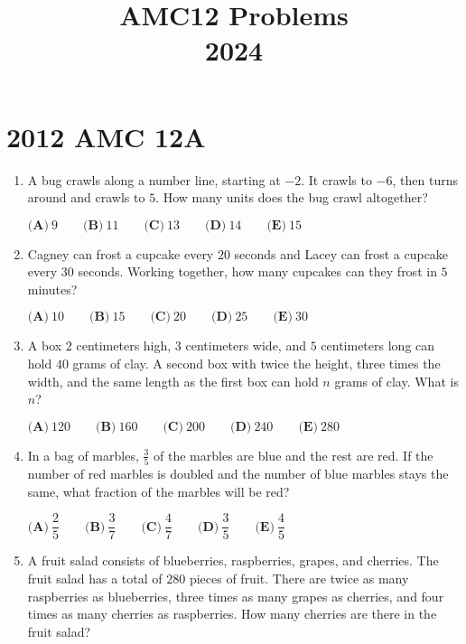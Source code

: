 \documentclass{article}
\title{AMC12 Problems \\ 2024}
\date{}
\begin{document}
\maketitle\thispagestyle{fancy}\newpage\section*{2012 AMC 12A}\begin{enumerate}[label=\arabic*., itemsep=0.5em]\item A bug crawls along a number line, starting at \(-2\). It crawls to \(-6\), then turns around and crawls to \(5\). How many units does the bug crawl altogether?

\( \textbf{(A)}\ 9\qquad\textbf{(B)}\ 11\qquad\textbf{(C)}\ 13\qquad\textbf{(D)}\ 14\qquad\textbf{(E)}\ 15 \)\par \vspace{0.5em}\item Cagney can frost a cupcake every \(20\) seconds and Lacey can frost a cupcake every \(30\) seconds. Working together, how many cupcakes can they frost in \(5\) minutes?

\( \textbf{(A)}\ 10\qquad\textbf{(B)}\ 15\qquad\textbf{(C)}\ 20\qquad\textbf{(D)}\ 25\qquad\textbf{(E)}\ 30 \)\par \vspace{0.5em}\item A box \(2\) centimeters high, \(3\) centimeters wide, and \(5\) centimeters long can hold \(40\) grams of clay.  A second box with twice the height, three times the width, and the same length as the first box can hold \(n\) grams of clay.  What is \(n\)?

\(\textbf{(A)}\ 120\qquad\textbf{(B)}\ 160\qquad\textbf{(C)}\ 200\qquad\textbf{(D)}\ 240\qquad\textbf{(E)}\ 280\)\par \vspace{0.5em}\item In a bag of marbles, \(\tfrac{3}{5}\) of the marbles are blue and the rest are red.  If the number of red marbles is doubled and the number of blue marbles stays the same, what fraction of the marbles will be red?

\( \textbf{(A)}\ \dfrac{2}{5}
\qquad\textbf{(B)}\ \dfrac{3}{7}
\qquad\textbf{(C)}\ \dfrac{4}{7}
\qquad\textbf{(D)}\ \dfrac{3}{5}
\qquad\textbf{(E)}\ \dfrac{4}{5}
 \)\par \vspace{0.5em}\item A fruit salad consists of blueberries, raspberries, grapes, and cherries.  The fruit salad has a total of \(280\) pieces of fruit.  There are twice as many raspberries as blueberries, three times as many grapes as cherries, and four times as many cherries as raspberries.  How many cherries are there in the fruit salad?


\end{enumerate}
\end{document}

